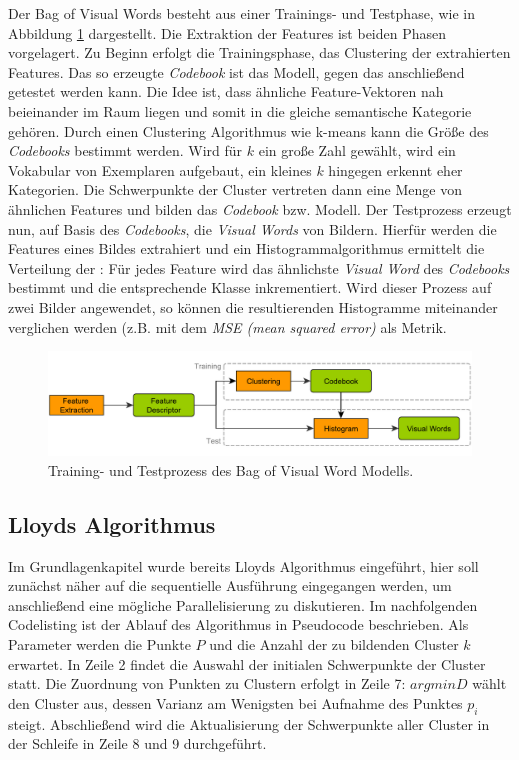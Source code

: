 Der Bag of Visual Words besteht aus einer Trainings- und Testphase, wie in Abbildung \ref{img:bovw} dargestellt. Die Extraktion der Features ist beiden Phasen vorgelagert.\newline
Zu Beginn erfolgt die Trainingsphase, das Clustering der extrahierten Features. Das so erzeugte \textit{Codebook} ist das Modell, gegen das anschließend getestet werden kann. Die Idee ist, dass ähnliche Feature-Vektoren nah beieinander im Raum liegen und somit in die gleiche semantische Kategorie gehören. Durch einen Clustering Algorithmus wie k-means kann die Größe des \textit{Codebooks} bestimmt werden. Wird für $k$ ein große Zahl gewählt, wird ein Vokabular von Exemplaren aufgebaut, ein kleines $k$ hingegen erkennt eher Kategorien. Die Schwerpunkte der Cluster vertreten dann eine Menge von ähnlichen Features und bilden das \textit{Codebook} bzw. Modell.\newline
Der Testprozess erzeugt nun, auf Basis des \textit{Codebooks}, die \textit{Visual Words} von Bildern. Hierfür werden die Features eines Bildes extrahiert und ein Histogrammalgorithmus ermittelt die Verteilung der : Für jedes Feature wird das ähnlichste \textit{Visual Word} des \textit{Codebooks} bestimmt und die entsprechende Klasse inkrementiert. Wird dieser Prozess auf zwei Bilder angewendet, so können die resultierenden Histogramme miteinander verglichen werden (z.B. mit dem \textit{MSE (mean squared error)} als Metrik.

\begin{figure}
	\centering
	\includegraphics[scale=0.65]{images/bovw_process.pdf}
	\caption{Training- und Testprozess des Bag of Visual Word Modells.}
	\label{img:bovw}
\end{figure}

\subsection{Lloyds Algorithmus}

Im Grundlagenkapitel wurde bereits Lloyds Algorithmus eingeführt, hier soll zunächst näher auf die sequentielle Ausführung eingegangen werden, um anschließend eine mögliche Parallelisierung zu diskutieren. Im nachfolgenden Codelisting ist der Ablauf des Algorithmus in Pseudocode beschrieben. Als Parameter werden die Punkte $P$ und die Anzahl der zu bildenden Cluster $k$ erwartet. In Zeile 2 findet die Auswahl der initialen Schwerpunkte der Cluster statt. Die Zuordnung von Punkten zu Clustern erfolgt in Zeile 7: $argminD$ wählt den Cluster aus, dessen Varianz am Wenigsten bei Aufnahme des Punktes $p_{i}$ steigt. Abschließend wird die Aktualisierung der Schwerpunkte aller Cluster in der Schleife in Zeile 8 und 9 durchgeführt.

